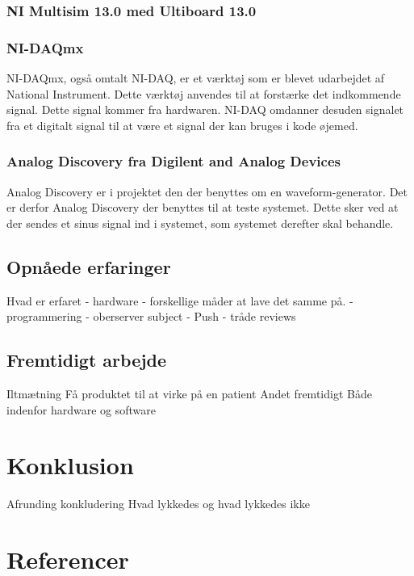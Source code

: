 \subsection{NI Multisim 13.0 med Ultiboard 13.0}

\subsection{NI-DAQmx}
NI-DAQmx, også omtalt NI-DAQ, er et værktøj som er blevet udarbejdet af National Instrument. Dette værktøj anvendes til at forstærke det indkommende signal. Dette signal kommer fra hardwaren. NI-DAQ omdanner desuden signalet fra et digitalt signal til at være et signal der kan bruges i kode øjemed. 
\subsection{Analog Discovery fra Digilent and Analog Devices}
Analog Discovery er i projektet den der benyttes om en waveform-generator. Det er derfor Analog Discovery der benyttes til at teste systemet. Dette sker ved at der sendes et sinus signal ind i systemet, som systemet derefter skal behandle.
\section{Opnåede erfaringer}
Hvad er erfaret
 - hardware
 	- forskellige måder at lave det samme på.
 - programmering
 	- oberserver subject
 	- Push
 	- tråde
reviews
\section{Fremtidigt arbejde}
Iltmætning
Få produktet til at virke på en patient
Andet fremtidigt
Både indenfor hardware og software
\chapter{Konklusion}
Afrunding
konkludering
Hvad lykkedes og hvad lykkedes ikke
\chapter{Referencer}
